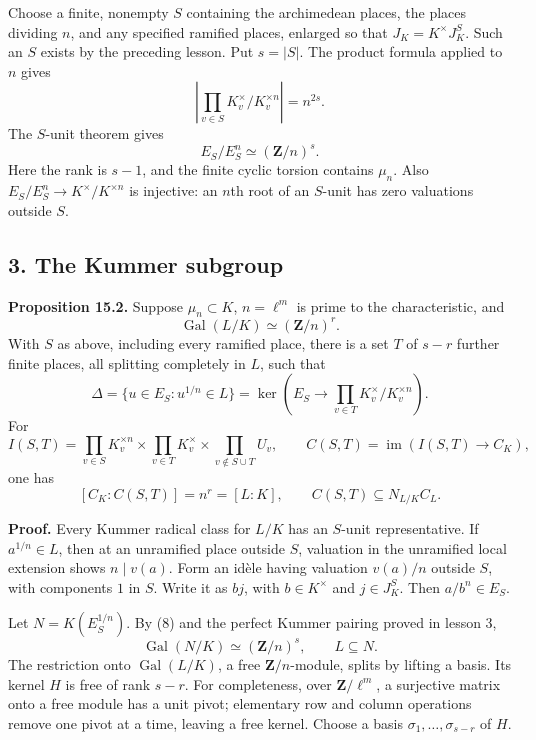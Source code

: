 \documentclass[11pt,a4paper]{article}
\begin{document}
Choose a finite, nonempty \(S\) containing the archimedean places, the
places dividing \(n\), and any specified ramified places, enlarged so
that \(J_K=K^\times J_K^S\). Such an \(S\) exists by the preceding
lesson. Put \(s=|S|\). The product formula applied to \(n\) gives \[
\left|\prod_{v\in S}K_v^\times/K_v^{\times n}\right|=n^{2s}.
\tag{7}
\] The \(S\)-unit theorem gives \[
E_S/E_S^n\simeq(\mathbf Z/n)^s.
\tag{8}
\] Here the rank is \(s-1\), and the finite cyclic torsion contains
\(\mu_n\). Also \(E_S/E_S^n\to K^\times/K^{\times n}\) is injective: an
\(n\)th root of an \(S\)-unit has zero valuations outside \(S\).

\subsection{3. The Kummer subgroup}\label{the-kummer-subgroup}

\textbf{Proposition 15.2.} Suppose \(\mu_n\subset K\), \(n=\ell^m\) is
prime to the characteristic, and \[
\operatorname{Gal}(L/K)\simeq(\mathbf Z/n)^r.
\] With \(S\) as above, including every ramified place, there is a set
\(T\) of \(s-r\) further finite places, all splitting completely in
\(L\), such that \[
\Delta=\{u\in E_S:u^{1/n}\in L\}
=\ker\left(E_S\longrightarrow
\prod_{v\in T}K_v^\times/K_v^{\times n}\right).
\tag{9}
\] For \[
I(S,T)=
\prod_{v\in S}K_v^{\times n}
\times\prod_{v\in T}K_v^\times
\times\prod_{v\notin S\cup T}U_v,
\qquad C(S,T)=\operatorname{im}(I(S,T)\to C_K),
\tag{10}
\] one has \[
[C_K:C(S,T)]=n^r=[L:K],
\qquad C(S,T)\subseteq N_{L/K}C_L.
\tag{11}
\]

\textbf{Proof.} Every Kummer radical class for \(L/K\) has an \(S\)-unit
representative. If \(a^{1/n}\in L\), then at an unramified place outside
\(S\), valuation in the unramified local extension shows \(n\mid v(a)\).
Form an idèle having valuation \(v(a)/n\) outside \(S\), with components
\(1\) in \(S\). Write it as \(b j\), with \(b\in K^\times\) and
\(j\in J_K^S\). Then \(a/b^n\in E_S\).

Let \(N=K(E_S^{1/n})\). By (8) and the perfect Kummer pairing proved in
lesson 3, \[
\operatorname{Gal}(N/K)\simeq(\mathbf Z/n)^s,\qquad L\subseteq N.
\] The restriction onto \(\operatorname{Gal}(L/K)\), a free
\(\mathbf Z/n\)-module, splits by lifting a basis. Its kernel \(H\) is
free of rank \(s-r\). For completeness, over \(\mathbf Z/\ell^m\), a
surjective matrix onto a free module has a unit pivot; elementary row
and column operations remove one pivot at a time, leaving a free kernel.
Choose a basis \(\sigma_1,\ldots,\sigma_{s-r}\) of \(H\).
\end{document}
